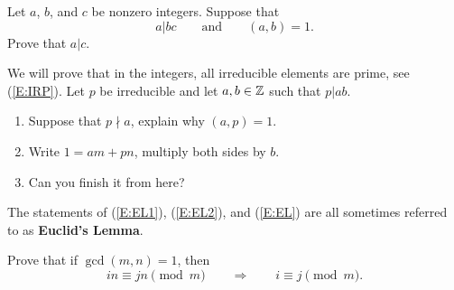 \documentclass{ximera}
\begin{document}
\begin{corollary}\label{E:EL2} 
  Let $a$, $b$, and $c$ be nonzero integers. Suppose that 
  \[
  a |bc\qquad\text{and}\qquad (a,b)=1.
  \]
  Prove that $a|c$. 
\end{corollary}



\begin{corollary}\label{E:EL} 
  We will prove that in the integers, all irreducible elements are
  prime, see (\ref{E:IRP}). Let $p$ be irreducible and let $a,b\in \mathbb Z$
  such that $p|ab$.
  \begin{enumerate}
  \item Suppose that $p\nmid a$, explain why $(a,p) =1$.
  \item Write $1 = am + pn$, multiply both sides by $b$.
  \item Can you finish it from here?
  \end{enumerate}
\end{corollary}



The statements of (\ref{E:EL1}), (\ref{E:EL2}), and (\ref{E:EL}) are
all sometimes referred to as \textbf{Euclid's Lemma}.



\begin{exercise} Prove that if $\gcd(m,n) = 1$, then 
\[
in \equiv jn \pmod m \qquad \Rightarrow\qquad i\equiv j\pmod m.
\]
\end{exercise}
\end{document}
